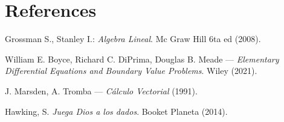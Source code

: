 
\section*{References}

\begin{enumerate}[label={[\arabic*]}]
    \item Grossman S., Stanley I.: \textit{Algebra Lineal}. Mc Graw Hill 6ta ed (2008).

    \item William E. Boyce, Richard C. DiPrima, Douglas B. Meade --- \textit{Elementary
    Differential Equations and Boundary Value Problems}. Wiley (2021).

    \item J. Marsden, A. Tromba --- \textit{Cálculo Vectorial} (1991).

    \item Hawking, S. \textit{Juega Dios a los dados}. Booket Planeta (2014).
\end{enumerate}
